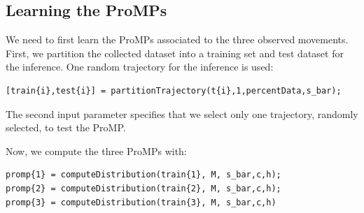 \documentclass[utf8]{frontiersSCNS} %
\begin{document}

\subsection{Learning the ProMPs}


We need to first learn the ProMPs associated to the three observed movements. 
First, we partition the collected dataset into a training set and test dataset for the inference. One random trajectory for the inference is used:
\begin{lstlisting}
[train{i},test{i}] = partitionTrajectory(t{i},1,percentData,s_bar);
\end{lstlisting}
The second input parameter specifies that we select only one trajectory, randomly selected, to test the ProMP. %

Now, we compute the three ProMPs with:

\begin{lstlisting}
promp{1} = computeDistribution(train{1}, M, s_bar,c,h);
promp{2} = computeDistribution(train{2}, M, s_bar,c,h);
promp{3} = computeDistribution(train{3}, M, s_bar,c,h)
\end{lstlisting}
\end{document}
